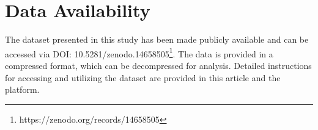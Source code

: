 \section{Data Availability}
The dataset presented in this study has been made publicly available and can be accessed via DOI: 10.5281/zenodo.14658505\footnote{https://zenodo.org/records/14658505}. The data is provided in a compressed format, which can be decompressed for analysis. Detailed instructions for accessing and utilizing the dataset are provided in this article and the platform.
